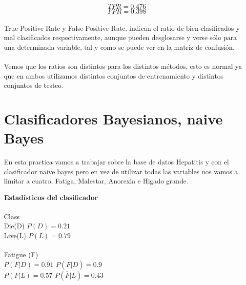 \documentclass[es]{ifirak}
\begin{document}
$$TPR =0.476    			$$
$$FPR = 0.398$$

\paragraph{}
True Positive Rate y False Positive Rate, indican el ratio de bien clasificados y mal clasificados respectivamente, aunque pueden desglosarse y verse sólo para una determinada variable, tal y como se puede ver en la matriz de confusión.
\paragraph{}
Vemos que los ratios son distintos para los distintos métodos, esto es normal ya que en ambos utilizamos distintos conjuntos de entrenamiento y distintos conjuntos de testeo.

\section{Clasificadores Bayesianos, naive Bayes}
\paragraph{}
En esta practica vamos a trabajar sobre la base de datos Hepatitis y con el clasificador naive bayes pero en vez de utilizar todas las variables nos vamos a limitar a cuatro, Fatiga, Malestar, Anorexia e Higado grande.

\vspace{0.5cm}
\textbf{Estadísticos del clasificador}

\paragraph{}
Class\\
Die(D) 	\hspace{2.5cm}	$P (D) = 0.21$\\
Live(L)		\hspace{2.5cm}  $P (L) = 0.79$\\
\paragraph{}
Fatigue (F)\\
$P(F | D ) = 0.91$ \hspace{2.5cm}	$P(\overline{F} | D ) = 0.9$\\
$P(F | L ) = 0.57$ \hspace{2.5cm}	$P(\overline{F} | L ) = 0.43$\\
\end{document}
